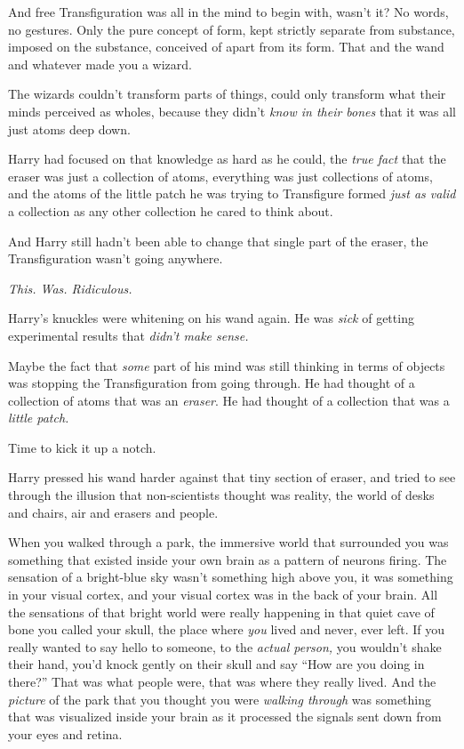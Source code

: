 And free Transfiguration was all in the mind to begin with, wasn’t it? No words, no gestures. Only the pure concept of form, kept strictly separate from substance, imposed on the substance, conceived of apart from its form. That and the wand and whatever made you a wizard.

The wizards couldn’t transform parts of things, could only transform what their minds perceived as wholes, because they didn’t \emph{know in their bones} that it was all just atoms deep down.

Harry had focused on that knowledge as hard as he could, the \emph{true fact} that the eraser was just a collection of atoms, everything was just collections of atoms, and the atoms of the little patch he was trying to Transfigure formed \emph{just as valid} a collection as any other collection he cared to think about.

And Harry still hadn’t been able to change that single part of the eraser, the Transfiguration wasn’t going anywhere.

\emph{This. Was. Ridiculous.}

Harry’s knuckles were whitening on his wand again. He was \emph{sick} of getting experimental results that \emph{didn’t make sense.}

Maybe the fact that \emph{some} part of his mind was still thinking in terms of objects was stopping the Transfiguration from going through. He had thought of a collection of atoms that was an \emph{eraser}. He had thought of a collection that was a \emph{little patch.}

Time to kick it up a notch.

Harry pressed his wand harder against that tiny section of eraser, and tried to see through the illusion that non-scientists thought was reality, the world of desks and chairs, air and erasers and people.

When you walked through a park, the immersive world that surrounded you was something that existed inside your own brain as a pattern of neurons firing. The sensation of a bright-blue sky wasn’t something high above you, it was something in your visual cortex, and your visual cortex was in the back of your brain. All the sensations of that bright world were really happening in that quiet cave of bone you called your skull, the place where \emph{you} lived and never, ever left. If you really wanted to say hello to someone, to the \emph{actual person,} you wouldn’t shake their hand, you’d knock gently on their skull and say “How are you doing in there?” That was what people were, that was where they really lived. And the \emph{picture} of the park that you thought you were \emph{walking through} was something that was visualized inside your brain as it processed the signals sent down from your eyes and retina.

